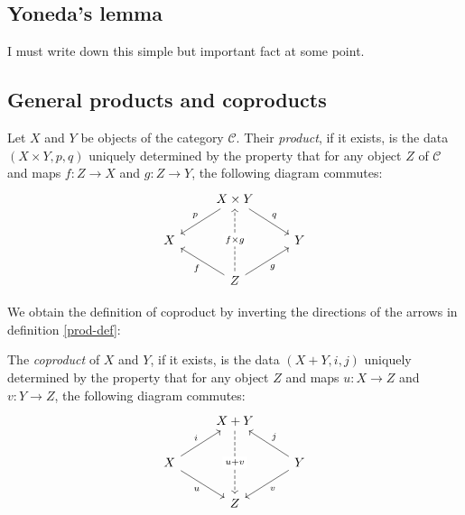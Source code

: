\documentclass{amsart}
\begin{document}
\subsection{Yoneda's lemma} I must write down this simple but important
fact at some point.

\subsection{General products and coproducts}

\begin{defn}\label{prod-def}
	Let $X$ and $Y$ be objects of the category $\mathcal{C}$. Their
	\emph{product}, if it exists, is the data $(X \times Y, p, q)$
	uniquely determined by the property that for any object $Z$ of
	$\mathcal{C}$ and maps $f : Z \to X$ and $g : Z \to Y$, the
	following diagram commutes:
	\begin{equation}\label{prod-cd}
		\begin{tikzcd}
			& X \times Y \arrow[ld, "p"'] \arrow[rd, "q"] & \\
			  X &            & Y \\
			  & Z \arrow[lu, "f"] \arrow[ru, "g"']
			      \arrow[uu, dashed, "f \times g" description] & 
		\end{tikzcd}
	\end{equation}
\end{defn}

We obtain the definition of coproduct by inverting the directions of the
arrows in definition \ref{prod-def}:

\begin{defn}\label{coprod-def}
	The \emph{coproduct} of $X$ and $Y$, if it exists, is the data
	$(X + Y, i, j)$ uniquely determined by the property that for any
	object $Z$ and maps $u : X \to Z$ and $v : Y \to Z$, the following
	diagram commutes:
	\begin{equation}\label{coprod-cd}
		\begin{tikzcd}
			& X + Y \arrow[dd, dashed, "u + v" description] &
					\\
			X \arrow[rd, "u"'] \arrow[ru, "i"] & & Y
				\arrow[ld, "v"] \arrow[lu, "j"'] \\
			& Z &
		\end{tikzcd}
	\end{equation}
\end{defn}



\end{document}
